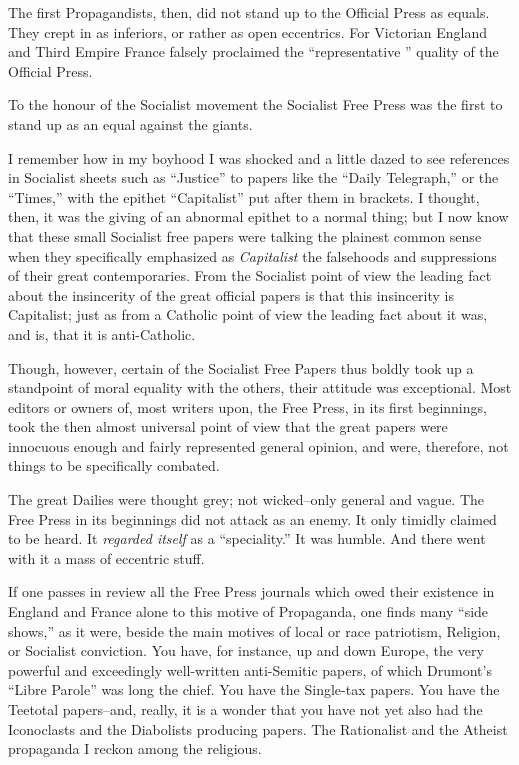 \documentclass{book}
\begin{document}
The first Propagandists, then, did not stand up to the Official Press as equals. They crept in as inferiors, or rather as open eccentrics. For Victorian England and Third Empire France falsely proclaimed the “representative ” quality of the Official Press.

To the honour of the Socialist movement the Socialist Free Press was the first to stand up as an equal against the giants.

I remember how in my boyhood I was shocked and a little dazed to see references in Socialist sheets such as “Justice” to papers like the “Daily Telegraph,” or the “Times,” with the epithet “Capitalist” put after them in brackets. I thought, then, it was the giving of an abnormal epithet to a normal thing; but I now know that these small Socialist free papers were talking the plainest common sense when they specifically emphasized as \emph{Capitalist} the falsehoods and suppressions of their great contemporaries. From the Socialist point of view the leading fact about the insincerity of the great official papers is that this insincerity is Capitalist; just as from a Catholic point of view the leading fact about it was, and is, that it is anti-Catholic.

Though, however, certain of the Socialist Free Papers thus boldly took up a standpoint of moral equality with the others, their attitude was exceptional. Most editors or owners of, most writers upon, the Free Press, in its first beginnings, took the then almost universal point of view that the great papers were innocuous enough and fairly represented general opinion, and were, therefore, not things to be specifically combated.

The great Dailies were thought grey; not wicked–only general and vague. The Free Press in its beginnings did not attack as an enemy. It only timidly claimed to be heard. It \emph{regarded itself} as a “speciality.” It was humble. And there went with it a mass of eccentric stuff.

If one passes in review all the Free Press journals which owed their existence in England and France alone to this motive of Propaganda, one finds many “side shows,” as it were, beside the main motives of local or race patriotism, Religion, or Socialist conviction. You have, for instance, up and down Europe, the very powerful and exceedingly well-written anti-Semitic papers, of which Drumont’s “Libre Parole” was long the chief. You have the Single-tax papers. You have the Teetotal papers–and, really, it is a wonder that you have not yet also had the Iconoclasts and the Diabolists producing papers. The Rationalist and the Atheist propaganda I reckon among the religious.
\end{document}
